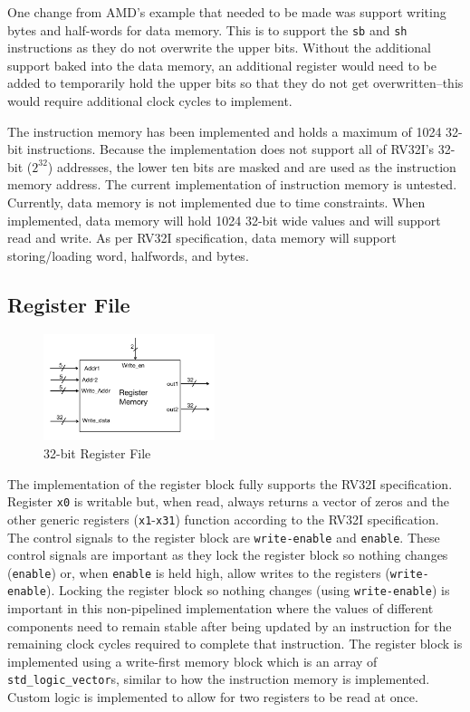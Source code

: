 \documentclass[lettersize,journal]{IEEEtran}
\begin{document}
One change from AMD's example that needed to be made was support writing bytes and half-words for data memory.
This is to support the \verb|sb| and \verb|sh| instructions as they do not overwrite the upper bits.
Without the additional support baked into the data memory,
an additional register would need to be added to temporarily hold the upper bits so that they do not get overwritten--this would require additional clock cycles to implement.

The instruction memory has been implemented and holds a maximum of 1024 32-bit instructions.
Because the implementation does not support all of RV32I's 32-bit ($2^{32}$) addresses, the lower ten bits are masked and are used as the instruction memory address.
The current implementation of instruction memory is untested.
Currently, data memory is not implemented due to time constraints.
When implemented, data memory will hold 1024 32-bit wide values and will support read and write.
As per RV32I specification, data memory will support storing/loading word, halfwords, and bytes.
\color{red}{Incomplete..}\color{black}\\
\subsection{Register File}
\begin{figure}[!h]
    \label{fig:regblock}
    \centering
    \includegraphics[width=5cm]{CPTR380_registers.png}
    \caption{32-bit Register File}
\end{figure}
The implementation of the register block fully supports the RV32I specification.
Register \verb|x0| is writable but, when read, always returns a vector of zeros and the other generic registers (\verb|x1|-\verb|x31|) function according to the RV32I specification.
The control signals to the register block are \verb|write-enable| and \verb|enable|.
These control signals are important as they lock the register block so nothing changes (\verb|enable|) or, when \verb|enable| is held high, allow writes to the registers (\verb|write-enable|).
Locking the register block so nothing changes (using \verb|write-enable|) is important in this non-pipelined implementation where the values of different components need to remain
 stable after being updated by an instruction for the remaining clock cycles required to complete that instruction.
The register block is implemented using a write-first memory block which is an array of \verb|std_logic_vector|s, similar to how the instruction memory is implemented.
Custom logic is implemented to allow for two registers to be read at once.
\end{document}
